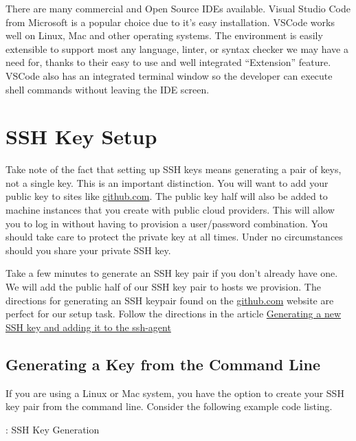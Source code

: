 \justifying
There are many commercial and Open Source IDEs available. Visual Studio Code from Microsoft is a popular choice due to it's easy
installation. VSCode works well on Linux, Mac and other operating systems.
The environment is easily extensible to support most any language, linter, or syntax checker we may have a need
for, thanks to their easy to use and well integrated ``Extension'' feature. VSCode also has an integrated terminal
window so the developer can execute shell commands without leaving the IDE screen.

\section{SSH Key Setup}

\justifying
Take note of the fact that setting up SSH keys means generating a pair of keys, not a single key. This is an important
distinction. You will want to add your public key to sites like \href{github.com}{github.com}. The public key half will
also be added to machine instances that you create with public cloud providers. This will allow you to log in without
having to provision a user/password combination. You should take care to protect the private key at all times. Under no circumstances
should you share your private SSH key. \cite{ssh}

\justifying
Take a few minutes to generate an SSH key pair if you don't already have one. We will add the public half of
our SSH key pair to hosts we provision. The directions for generating an SSH keypair found on the
\href{github.com}{github.com} website are perfect for our setup task. Follow the directions in the article
\href{https://docs.github.com/en/github/authenticating-to-github/connecting-to-github-with-ssh/generating-a-new-ssh-key-and-adding-it-to-the-ssh-agent}{Generating a new SSH key and adding it to the ssh-agent}

\subsection{Generating a Key from the Command Line}

If you are using a Linux or Mac system, you have the option to create your SSH key pair from the command line. Consider
the following example code listing.

\begin{mybox}{\thetcbcounter: SSH Key Generation}

\end{mybox}

